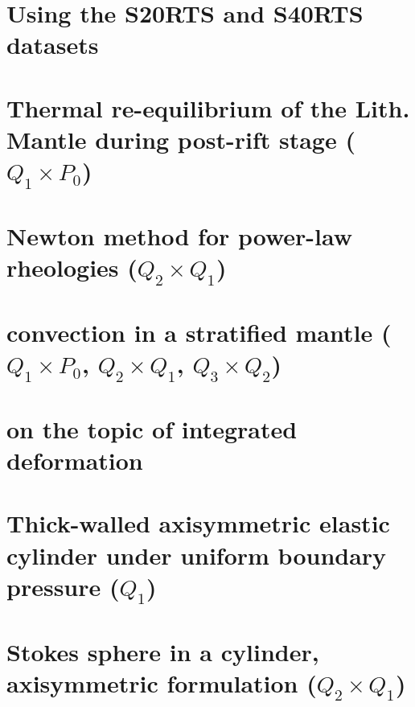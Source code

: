 \documentclass[a4paper,11pt]{report}
\begin{document}
\chapter{Using the S20RTS and S40RTS datasets \label{f85}} %

\chapter{Thermal re-equilibrium of the Lith. Mantle during post-rift stage ($Q_1\times P_0$)\label{f86}} %

\chapter{Newton method for power-law rheologies ($Q_2\times Q_1$) \label{f87}} %

\chapter{convection in a stratified mantle ($Q_1 \times P_0$, $Q_2\times Q_1$, $Q_3\times Q_2$) \label{f88}}%

\chapter{on the topic of integrated deformation	\label{f89}} %

\chapter{Thick-walled axisymmetric elastic cylinder under uniform boundary pressure ($Q_1$) \label{f90}} %

\chapter{Stokes sphere in a cylinder, axisymmetric formulation ($Q_2\times Q_1$) \label{f91}} %
\end{document}

